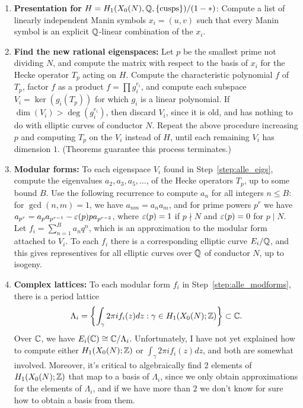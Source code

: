 \documentclass{book}
\begin{document}
\begin{enumerate}
\item \label{step:alle_present}
{\bf Presentation for } $H=H_1(X_0(N),\mathbb{Q},\{\text{cusps}\})/(1-*)$:
Compute a list of linearly independent
Manin symbols $x_i=(u,v)$
such that every Manin symbol is an explicit
$\mathbb{Q}$-linear combination of the $x_i$.

\item\label{step:alle_eigs}
{\bf Find the new rational eigenspaces:}
Let $p$ be the smallest prime not dividing $N$,
and compute the matrix with respect to the basis of $x_i$
for the Hecke operator $T_p$ acting on $H$.
Compute the characteristic polynomial $f$
of $T_p$, factor $f$ as a product $f = \prod g_i^{e_i}$,
and compute each subspace $V_i = \ker(g_i(T_p))$ for
which $g_i$ is a linear polynomial.
If $\dim(V_i) > \deg(g_i^{e_i})$, then discard $V_i$,
since it is old, and has nothing to do with elliptic
curves of conductor $N$.  Repeat the above procedure
increasing $p$ and computing $T_p$ on the $V_i$ instead
of $H$, until each remaining $V_i$ has dimension $1$.
(Theorems guarantee this process terminates.)
\item\label{step:alle_modforms}
{\bf Modular forms:}
To each eigenspace $V_i$ found in Step~\ref{step:alle_eigs},
compute the eigenvalues $a_2, a_3, a_5, \ldots$, of the Hecke
operators $T_p$, up to some bound $B$.  Use the following
recurrence to compute $a_n$ for all integers $n\leq B$:
for $\gcd(n,m)=1$, we have $a_{nm} = a_n a_m$, and
for prime powers $p^r$ we have
$a_{p^r} = a_p a_{p^{r-1}} - \varepsilon(p) p a_{p^{r-2}}$,
where $\varepsilon(p)=1$ if $p\nmid N$ and $\varepsilon(p)=0$ for $p\mid N$.
Let $f_i = \sum_{n=1}^{B} a_n q^n$, which is an approximation
to the modular form attached to $V_i$.
To each $f_i$ there is a corresponding
elliptic curve $E_i/\mathbb{Q}$, and this gives representives
for all elliptic curves over $\mathbb{Q}$ of conductor $N$, up to
isogeny.


\item\label{step:alle_lattice}
{\bf Complex lattices:}
To each modular form $f_i$ in Step~\ref{step:alle_modforms},
there is a period lattice
$$
\Lambda_i = \left\{\int_{\gamma} 2\pi i f_i(z)dz : \gamma\in
H_1(X_0(N);\mathbb{Z})\right\} \subset \mathbb{C}.
$$
Over $\mathbb{C}$, we have
$E_i(\mathbb{C}) \cong \mathbb{C}/\Lambda_i$.
Unfortunately, I have not yet explained
how to compute either $H_1(X_0(N);\mathbb{Z})$ or
$\int_{\gamma} 2\pi i f_i(z)dz$,
and both are somewhat involved.  Moreover,
it's critical to algebraically find
2 elements of $H_1(X_0(N);\mathbb{Z})$ that map
to a basis of $\Lambda_i$, since we only obtain approximations
for the elements of $\Lambda_i$, and if we have more than $2$
we don't know for sure how to obtain a basis from them.


\end{enumerate}
\end{document}
